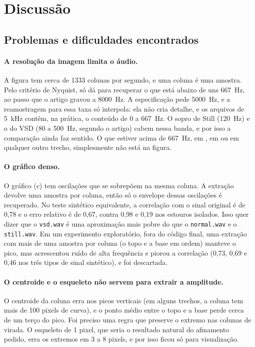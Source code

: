 \section{Discussão}

\subsection{Problemas e dificuldades encontrados}

\paragraph{A resolução da imagem limita o áudio.}
A figura tem cerca de 1333 colunas por segundo, e uma coluna é uma amostra. Pelo critério de Nyquist, só dá para recuperar o que está abaixo de uns 667~Hz, ao passo que o artigo gravou a 8000~Hz. A especificação pede 5000~Hz, e a reamostragem para essa taxa só interpola: ela não cria detalhe, e os arquivos de 5~kHz contêm, na prática, o conteúdo de 0 a 667~Hz. O sopro de Still (120~Hz) e o do VSD (80 a 500~Hz, segundo o artigo) cabem nessa banda, e por isso a comparação ainda faz sentido. O que estiver acima de 667~Hz, em \Sone, em \Stwo{} ou em qualquer outro trecho, simplesmente não está na figura.

\paragraph{O gráfico denso.}
O gráfico (c) tem oscilações que se sobrepõem na mesma coluna. A extração devolve uma amostra por coluna, então só o envelope dessas oscilações é recuperado. No teste sintético equivalente, a correlação com o sinal original é de 0,78 e o erro relativo é de 0,67, contra 0,98 e 0,19 nos estouros isolados. Isso quer dizer que o \texttt{vsd.wav} é uma aproximação mais pobre do que o \texttt{normal.wav} e o \texttt{still.wav}. Em um experimento exploratório, fora do código final, uma extração com mais de uma amostra por coluna (o topo e a base em ordem) manteve o pico, mas acrescentou ruído de alta frequência e piorou a correlação (0,73, 0,69 e 0,46 nos três tipos de sinal sintético), e foi descartada.

\paragraph{O centroide e o esqueleto não servem para extrair a amplitude.}
O centroide da coluna erra nos picos verticais (em alguns trechos, a coluna tem mais de 100 pixels de curva), e o ponto médio entre o topo e a base perde cerca de um terço do pico. Foi preciso uma regra que preserve o extremo nas colunas de virada. O esqueleto de 1 pixel, que seria o resultado natural do afinamento pedido, erra os extremos em 3 a 8 pixels, e por isso ficou só para visualização.

